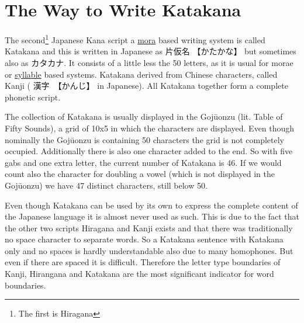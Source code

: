 \chapter{The Way to Write Katakana}
\label{chap:WritingKatakana}
\label{chap:TheWayToWriteKatakana}
\label{sec:TheWayToWriteKatakana}  %
\label{sec:Gojuonzu}               %



The second\footnote{The first is Hiragana} Japanese Kana script a
\hyperref[sec:Mora]{mora}  based writing system is called Katakana and this is
written in Japanese as {片仮名} {【かたかな】} but sometimes also as
{カタカナ}.  It consists of a little less the 50 letters, as it is usual for
morae or \hyperref[sec:Syllable]{syllable} based systems. Katakana derived from
Chinese characters, called Kanji ( {漢字}　{【かんじ】} in Japanese). All
Katakana together form a complete phonetic script.

The collection of Katakana is usually displayed in the Gojūonzu (lit. Table of
Fifty Sounds), a grid of 10x5 in which the characters are displayed. Even
though nominally the Gojūonzu is containing 50 characters the grid is not
completely occupied. Additionally there is also one character added to the
end. So with five gabs and one extra letter, the current number of Katakana is
46. If we would count also the character for doubling a vowel (which is not
displayed in the Gojūonzu) we have 47 distinct characters, still below 50. 



Even though Katakana can be used by its own to express the complete content of
the Japanese language it is almost never used as such. This is due to the fact
that the other two scripts Hiragana and Kanji exists and that there was
traditionally no space character to separate words. So a Katakana sentence with
Katakana only and no spaces is hardly understandable also due to many
homophones.  But even if there are spaced it is difficult. Therefore the letter
type boundaries of Kanji, Hirangana and Katakana are the most significant
indicator for word boundaries.

